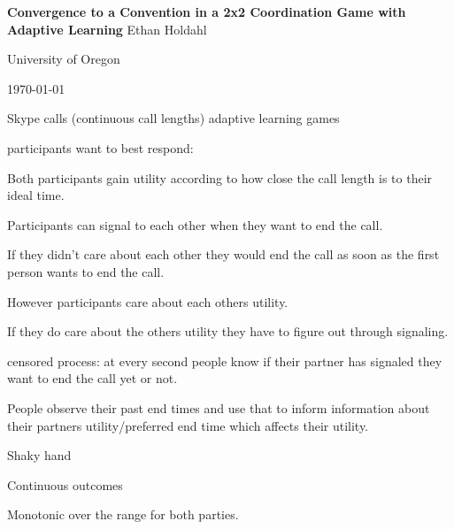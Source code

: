 \documentclass{article}
\begin{document}
\centering
\Large
\textbf{Convergence to a Convention in a 2x2 Coordination Game with Adaptive Learning}
\vskip0pt
Ethan Holdahl

\large
University of Oregon

\today

\vskip24pt

Skype calls (continuous call lengths) adaptive learning games

participants want to best respond:

Both participants gain utility according to how close the call length is to their ideal time.

Participants can signal to each other when they want to end the call.

If they didn't care about each other they would end the call as soon as the first person wants to end the call.

However participants care about each others utility.

If they do care about the others utility they have to figure out through signaling.

censored process: at every second people know if their partner has signaled they want to end the call yet or not.

People observe their past end times and use that to inform information about their partners utility/preferred end time which affects their utility.

Shaky hand

Continuous outcomes

Monotonic over the range  for both parties.
\end{document}
